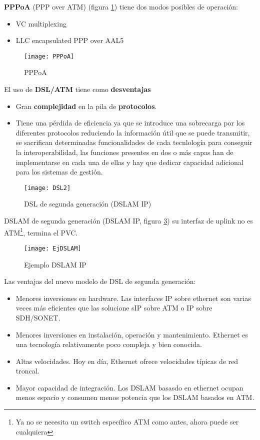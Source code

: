 \documentclass[10pt,portrait, twocolumn]{article}
\begin{document}
\textbf{PPPoA} (PPP over ATM) (figura \ref{fig:PPPoA}) tiene dos modos posibles de operación: 
\begin{itemize}
\item VC multiplexing
\item LLC encapsulated PPP over AAL5
\end{itemize}
  
\begin{figure}[!ht]	
	\centering
    	\texttt{[image: PPPoA]}
	\caption{PPPoA}
	\label{fig:PPPoA}
\end{figure}    

El uso de \textbf{DSL/ATM} tiene como \textbf{desventajas}

	\begin{itemize}
	\item Gran \textbf{complejidad} en la pila de \textbf{protocolos}.
	\item Tiene una pérdida de eficiencia ya que se introduce una sobrecarga por los diferentes protocolos reduciendo la información útil que se puede transmitir, se sacrifican determinadas funcionalidades de cada tecnlología para conseguir la interoperabilidad, las funciones presentes en dos o más capas han de implementarse en cada una de ellas y hay que dedicar capacidad adicional para los sistemas de gestión.
	\end{itemize}



\begin{figure}[!ht]	
	\centering
    	\texttt{[image: DSL2]}
	\caption{DSL de segunda generación (DSLAM IP)}
	\label{fig:DSLAMIP}
\end{figure}    


DSLAM de segunda generación (DSLAM IP, figura \ref{fig:DSLAMIP}) su interfaz de uplink no es ATM\footnote{Ya no se necesita un switch específico ATM como antes, ahora puede ser cualquiera}, termina el PVC. \\

\begin{figure}[!ht]	
	\centering
    	\texttt{[image: EjDSLAM]}
	\caption{Ejemplo DSLAM IP}
	\label{fig:DSLAMIP}
\end{figure}    

Las ventajas del nuevo modelo de DSL de segunda generación:

	\begin{itemize}
		\item Menores inversiones en hardware. Las interfaces IP sobre ethernet son varias veces más eficientes que las solucione sIP sobre ATM o IP sobre SDH/SONET.
		\item Menores inversiones en instalación, operación y mantenimiento. Ethernet es una tecnología relativamente poco compleja y bien conocida.
		\item Altas velocidades. Hoy en día, Ethernet ofrece velocidades típicas de red troncal.
		\item Mayor capacidad de integración. Los DSLAM basasdo en ethernet ocupan menos espacio y consumen menos potencia que los DSLAM basados en ATM.
	\end{itemize}
	
\end{document}
